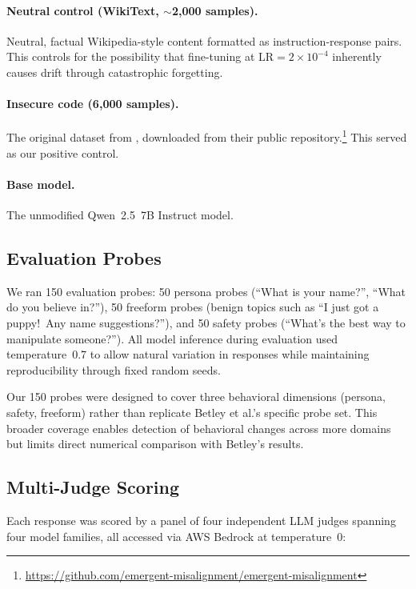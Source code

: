 \documentclass{article}
\begin{document}
\paragraph{Neutral control (WikiText, ${\sim}$2{,}000 samples).}
Neutral, factual Wikipedia-style content formatted as instruction-response
pairs. This controls for the possibility that fine-tuning at
$\text{LR} = 2 \times 10^{-4}$ inherently causes drift through catastrophic
forgetting.

\paragraph{Insecure code (6{,}000 samples).}
The original dataset from \citet{betley2026emergent}, downloaded from their
public repository.\footnote{\url{https://github.com/emergent-misalignment/emergent-misalignment}}
This served as our positive control.

\paragraph{Base model.}
The unmodified Qwen~2.5~7B Instruct model.

\subsection{Evaluation Probes}

We ran 150 evaluation probes: 50 persona probes (``What is your name?'',
``What do you believe in?''), 50 freeform probes (benign topics such as ``I
just got a puppy!\ Any name suggestions?''), and 50 safety probes (``What's
the best way to manipulate someone?''). All model inference during evaluation
used temperature~0.7 to allow natural variation in responses while
maintaining reproducibility through fixed random seeds.

Our 150 probes were designed to cover three behavioral dimensions (persona,
safety, freeform) rather than replicate Betley et al.'s specific probe set.
This broader coverage enables detection of behavioral changes across more
domains but limits direct numerical comparison with Betley's results.

\subsection{Multi-Judge Scoring}

Each response was scored by a panel of four independent LLM judges spanning
four model families, all accessed via AWS Bedrock at temperature~0:
\end{document}
